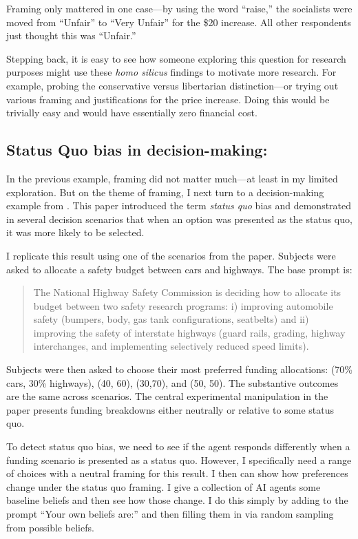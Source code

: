 \documentclass[11pt]{article}
\begin{document}
Framing only mattered in one case---by using the word ``raise,'' the socialists were moved from ``Unfair'' to ``Very Unfair'' for the \$20 increase.
All other respondents just thought this was ``Unfair.''

Stepping back, it is easy to see how someone exploring this question for research purposes might use these \emph{homo silicus} findings to motivate more research. 
For example, probing the conservative versus libertarian distinction---or trying out various framing and justifications for the price increase. 
Doing this would be trivially easy and would have essentially zero financial cost.

\subsection{Status Quo bias in decision-making: \cite{samuelson1988status}} \label{sec:samuelson_zeckhauser}

In the previous example, framing did not matter much---at least in my limited exploration.
But on the theme of framing, I next turn to a decision-making example from \cite{samuelson1988status}.
This paper introduced the term \emph{status quo} bias and demonstrated in several decision scenarios that when an option was presented as the status quo, it was more likely to be selected.

I replicate this result using one of the scenarios from the paper. 
Subjects were asked to allocate a safety budget between cars and highways. 
The base prompt is:
\begin{quote}
The National Highway Safety Commission is deciding how to allocate its budget between two safety research programs: i) improving automobile safety (bumpers, body, gas tank configurations, seatbelts) and ii) improving the safety of interstate highways (guard rails, grading, highway interchanges, and implementing selectively reduced speed limits).
\end{quote}
Subjects were then asked to choose their most preferred funding allocations: (70\% cars, 30\% highways), (40, 60), (30,70), and (50, 50).
The substantive outcomes are the same across scenarios.
The central experimental manipulation in the paper presents funding breakdowns either neutrally or relative to some status quo. 

To detect status quo bias, we need to see if the agent responds differently when a funding scenario is presented as a status quo.
However, I specifically need a range of choices with a neutral framing for this result. 
I then can show how preferences change under the status quo framing. 
I give a collection of AI agents some baseline beliefs and then see how those change. 
I do this simply by adding to the prompt ``Your own beliefs are:'' and then filling them in via random sampling from possible beliefs.
\end{document}
